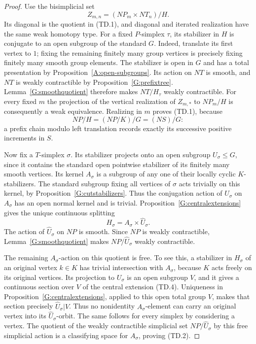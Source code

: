 \begin{proof}
Use the bisimplicial set
\[
 Z_{m,n}=(NP_m\times NT_n)/H.
\]
Its diagonal is the quotient in (TD.1), and diagonal and iterated
realization have the same weak homotopy type.
For a fixed $P$-simplex $\tau$, its stabilizer in $H$ is conjugate
to an open subgroup of the standard $G$. Indeed, translate its
first vertex to $1$; fixing the remaining finitely many group
vertices is precisely fixing finitely many smooth group elements.
The stabilizer is open in $G$ and has a total presentation by
Proposition~\ref{A:open-subgroups}. Its action on $NT$ is smooth,
and $NT$ is weakly contractible by
Proposition~\ref{G:prefixtree}. Lemma~\ref{G:smoothquotient}
therefore makes $NT/H_\tau$ weakly contractible.
For every fixed $m$ the projection of the vertical realization
of $Z_{m,*}$ to $NP_m/H$ is consequently a weak equivalence.
Realizing in $m$ proves (TD.1), because
\[
 NP/H=(NP/K)/G=(NS)/G:
\]
a prefix chain modulo left translation records exactly its
successive positive increments in $S$.

Now fix a $T$-simplex $\sigma$. Its stabilizer projects onto
an open subgroup $U_\sigma\leq G$, since it contains the
standard open pointwise stabilizer of its finitely many smooth
vertices. Its kernel $A_\sigma$ is a subgroup of any one of
their locally cyclic $K$-stabilizers. The standard subgroup
fixing all vertices of $\sigma$ acts trivially on this kernel,
by Proposition~\ref{G:cutstabilizers}. Thus the conjugation
action of $U_\sigma$ on $A_\sigma$ has an open normal kernel
and is trivial. Proposition~\ref{G:centralextensions} gives
the unique continuous splitting
\[
 H_\sigma=A_\sigma\times\widehat U_\sigma.
 \tag{TD.4}
\]
The action of $\widehat U_\sigma$ on $NP$ is smooth. Since
$NP$ is weakly contractible, Lemma~\ref{G:smoothquotient}
makes $NP/\widehat U_\sigma$ weakly contractible.

The remaining $A_\sigma$-action on this quotient is free.
To see this, a stabilizer in $H_\sigma$ of an original vertex
$k\in K$ has trivial intersection with $A_\sigma$, because
$K$ acts freely on its original vertices. Its projection to
$U_\sigma$ is an open subgroup $V$, and it gives a continuous
section over $V$ of the central extension (TD.4). Uniqueness
in Proposition~\ref{G:centralextensions}, applied to this open
total group $V$, makes that section precisely
$\widehat U_\sigma|V$. Thus no nonidentity $A_\sigma$-element
can carry an original vertex into its $\widehat U_\sigma$-orbit.
The same follows for every simplex by considering a vertex.
The quotient of the weakly contractible simplicial set
$NP/\widehat U_\sigma$ by this free simplicial action is a
classifying space for $A_\sigma$, proving (TD.2).


\end{proof}
